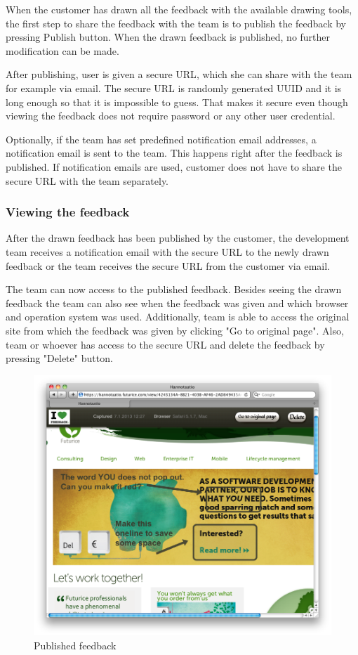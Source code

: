 \documentclass[english,12pt,a4paper,pdftex]{article}
\begin{document}
When the customer has drawn all the feedback with the available drawing tools, the first step to share the feedback with the team is to publish the feedback by pressing Publish button. When the drawn feedback is published, no further modification can be made.

After publishing, user is given a secure \ac{URL}, which she can share with the team for example via email. The secure \ac{URL} is randomly generated \ac{UUID} and it is long enough so that it is impossible to guess. That makes it secure even though viewing the feedback does not require password or any other user credential.

Optionally, if the team has set predefined notification email addresses, a notification email is sent to the team. This happens right after the feedback is published. If notification emails are used, customer does not have to share the secure \ac{URL} with the team separately.

\subsubsection{Viewing the feedback}

After the drawn feedback has been published by the customer, the development team receives a notification email with the secure \ac{URL} to the newly drawn feedback or the team receives the secure \ac{URL} from the customer via email.

The team can now access to the published feedback. Besides seeing the drawn feedback the team can also see when the feedback was given and which browser and operation system was used. Additionally, team is able to access the original site from which the feedback was given by clicking "Go to original page". Also, team or whoever has access to the secure \ac{URL} and delete the feedback by pressing "Delete" button.

\begin{figure}[htb]
\begin{center}
\includegraphics[width=1.0\textwidth]{published_feedback.png}
\end{center}
\caption{Published feedback}
\end{figure}
\end{document}
